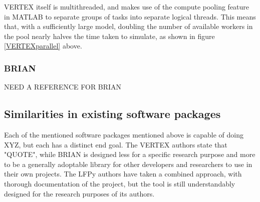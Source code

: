 VERTEX itself is multithreaded, and makes use of the compute pooling feature in
MATLAB to separate groups of tasks into separate logical threads. This means
that, with a sufficiently large model, doubling the number of available workers
in the pool nearly halves the time taken to simulate, as shown in figure
\ref{VERTEXparallel} above.

\subsubsection{BRIAN}
NEED A REFERENCE FOR BRIAN
\autocite{stimberg_brian_2019}

\subsection{Similarities in existing software packages}

Each of the mentioned software packages mentioned above is capable of doing XYZ,
but each has a distinct end goal. The VERTEX authors state that "QUOTE", while
BRIAN is designed less for a specific research purpose and more to be a
generally adoptable library for other developers and researchers to use in their
own projects. The LFPy authors have taken a combined approach, with thorough
documentation of the project, but the tool is still understandably designed for
the research purposes of its authors. 
